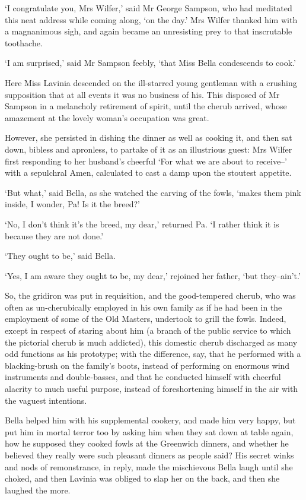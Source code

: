 ‘I congratulate you, Mrs Wilfer,’ said Mr George Sampson, who had
meditated this neat address while coming along, ‘on the day.’ Mrs Wilfer
thanked him with a magnanimous sigh, and again became an unresisting
prey to that inscrutable toothache.

‘I am surprised,’ said Mr Sampson feebly, ‘that Miss Bella condescends
to cook.’

Here Miss Lavinia descended on the ill-starred young gentleman with a
crushing supposition that at all events it was no business of his. This
disposed of Mr Sampson in a melancholy retirement of spirit, until the
cherub arrived, whose amazement at the lovely woman’s occupation was
great.

However, she persisted in dishing the dinner as well as cooking it, and
then sat down, bibless and apronless, to partake of it as an illustrious
guest: Mrs Wilfer first responding to her husband’s cheerful ‘For what
we are about to receive--’ with a sepulchral Amen, calculated to cast a
damp upon the stoutest appetite.

‘But what,’ said Bella, as she watched the carving of the fowls, ‘makes
them pink inside, I wonder, Pa! Is it the breed?’

‘No, I don’t think it’s the breed, my dear,’ returned Pa. ‘I rather
think it is because they are not done.’

‘They ought to be,’ said Bella.

‘Yes, I am aware they ought to be, my dear,’ rejoined her father, ‘but
they--ain’t.’

So, the gridiron was put in requisition, and the good-tempered cherub,
who was often as un-cherubically employed in his own family as if he had
been in the employment of some of the Old Masters, undertook to grill
the fowls. Indeed, except in respect of staring about him (a branch of
the public service to which the pictorial cherub is much addicted), this
domestic cherub discharged as many odd functions as his prototype; with
the difference, say, that he performed with a blacking-brush on the
family’s boots, instead of performing on enormous wind instruments and
double-basses, and that he conducted himself with cheerful alacrity to
much useful purpose, instead of foreshortening himself in the air with
the vaguest intentions.

Bella helped him with his supplemental cookery, and made him very happy,
but put him in mortal terror too by asking him when they sat down at
table again, how he supposed they cooked fowls at the Greenwich dinners,
and whether he believed they really were such pleasant dinners as people
said? His secret winks and nods of remonstrance, in reply, made the
mischievous Bella laugh until she choked, and then Lavinia was obliged
to slap her on the back, and then she laughed the more.

